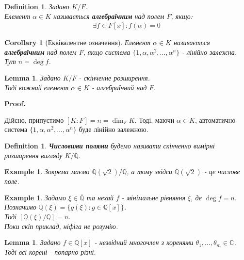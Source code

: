 \documentclass[a4paper, 10pt]{article}
\makeatletter
\theoremstyle{theoremdd}
\theoremstyle{theoremdd}
\newtheorem{definition}[theorem]{Definition}
\theoremstyle{theoremdd}
\theoremstyle{theoremdd}
\newtheorem{example}[theorem]{Example}
\theoremstyle{theoremdd}
\theoremstyle{theoremdd}
\theoremstyle{theoremdd}
\newtheorem{lemma}[theorem]{Lemma}
\theoremstyle{theoremdd}
\newtheorem{corollary}[theorem]{Corollary}
\renewenvironment{proof}[1][Proof.\\]{\par
\pushQED{\hfill \qed}%
\normalfont \topsep6\p@\@plus6\p@\relax
\trivlist
\item\relax
{\bfseries
#1\@addpunct{.}}\hspace\labelsep\ignorespaces
}{%
\popQED\endtrivlist\@endpefalse
}
\makeatother
\begin{document}
\begin{definition}
Задано $K/F$.\\
Елемент $\alpha \in K$ називається \textbf{алгебраїчним} над полем $F$, якщо:
\begin{align*}
\exists f \in F[x]: f(\alpha) = 0
\end{align*}
\end{definition}

\begin{corollary}[Еквівалентне означення]
Елемент $\alpha \in K$ називається \textbf{алгебраїчним} над полем $F$, якщо система $\{1,\alpha,\alpha^2,\dots,\alpha^n\}$ - лінійно залежна.\\
Тут $n = \deg f$.
\end{corollary}

\begin{lemma}
Задано $K/F$ - скінченне розширення.\\
Тоді кожний елемент $\alpha \in K$ - алгебраїчний над $F$.
\end{lemma}

\begin{proof}
Дійсно, припустимо $[K:F] = n = \dim_F K$. Тоді, маючи $\alpha \in K$, автоматично система $\{1,\alpha,\alpha^2,\dots,\alpha^n\}$ буде лінійно залежною.
\end{proof}

\begin{definition}
\textbf{Числовими полями} будемо називати скінченно вимірні розширення вигляду $K / \mathbb{Q}$.
\end{definition}

\begin{example}
Зокрема маємо $\mathbb{Q}(\sqrt{2}) / \mathbb{Q}$, а тому звідси $\mathbb{Q}(\sqrt{2})$ - це числове поле.
\end{example}

\begin{example}
Задамо $\xi \in \overline{\mathbb{Q}}$ та нехай $f$ - мінімальне рівняння $\xi$, де $\deg f = n$.\\
Позначимо $\mathbb{Q}(\xi) = \{ g(\xi) : g \in \mathbb{Q}[x] \}$.\\
Тоді $[\mathbb{Q}(\xi) / \mathbb{Q}] = n$.\\
\textit{Поки скіп приклад, ніфіга не розумію.}
\end{example}

\begin{lemma}
Задано $f \in \mathbb{Q}[x]$ - незвідний многочлен з коренями $\theta_1,\dots,\theta_m \in \mathbb{C}$.\\
Тоді всі корені - попарно різні.
\end{lemma}
\end{document}
